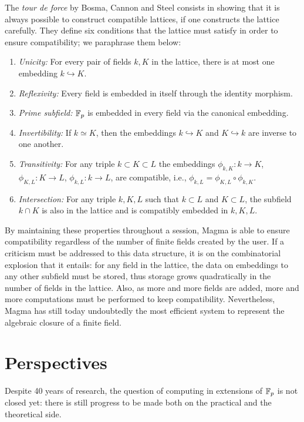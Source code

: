 \documentclass{report}
\theoremstyle{plain}
\theoremstyle{definition}
\begin{document}
The \emph{tour de force} by Bosma, Cannon and Steel consists in
showing that it is always possible to construct compatible lattices,
if one constructs the lattice carefully. %
They define six conditions that the lattice must satisfy in order to
ensure compatibility; we paraphrase them below:
\begin{enumerate}
\item \emph{Unicity:} For every pair of fields $k,K$ in the lattice,
  there is at most one embedding $k\hookrightarrow K$.
\item \emph{Reflexivity:} Every field is embedded in itself through
  the identity morphism.
\item \emph{Prime subfield:} $\mathbb{F}_p$ is embedded in every field via the
  canonical embedding.
\item \emph{Invertibility:} If $k≃K$, then the embeddings
  $k\hookrightarrow K$ and $K\hookrightarrow k$ are inverse to one
  another.
\item \emph{Transitivity:} For any triple $k⊂K⊂L$ the embeddings
  $ϕ_{k,K}:k→K$, $ϕ_{K,L}:K→L$, $ϕ_{k,L}:k→L$, are compatible, i.e.,
  $ϕ_{k,L}=ϕ_{K,L}∘ϕ_{k,K}$.
\item \emph{Intersection:} For any triple $k,K,L$ such that $k⊂L$ and
  $K⊂L$, the subfield $k∩K$ is also in the lattice and is compatibly
  embedded in $k,K,L$.
\end{enumerate}

By maintaining these properties throughout a session, Magma is able to
ensure compatibility regardless of the number of finite fields created
by the user. %
If a criticism must be addressed to this data structure, it is on the
combinatorial explosion that it entails: for any field in the lattice,
the data on embeddings to any other subfield must be stored, thus
storage grows quadratically in the number of fields in the lattice. %
Also, as more and more fields are added, more and more computations
must be performed to keep compatibility. %
Nevertheless, Magma has still today undoubtedly the most efficient
system to represent the algebraic closure of a finite field. %


\section{Perspectives}

Despite 40 years of research, the question of computing in extensions
of $\mathbb{F}_p$ is not closed yet: there is still progress to be made both
on the practical and the theoretical side. %
\end{document}
